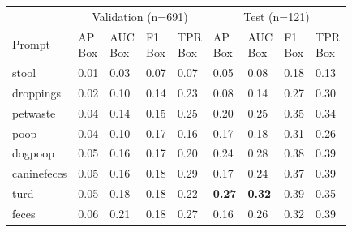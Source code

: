 \begin{table}[t]
\ifwacv \else \CaptionPrompt \fi
\centering
\begin{tabular}{lllllllll}
\toprule
\multicolumn{1}{l}{} & \multicolumn{4}{c}{Validation (n=691)} & \multicolumn{4}{c}{Test (n=121)} \\
 Prompt      & \makecell{AP\\Box}   & \makecell{AUC\\Box}   & \makecell{F1\\Box}   & \makecell{TPR\\Box}   & \makecell{AP\\Box}   & \makecell{AUC\\Box}   & \makecell{F1\\Box}   & \makecell{TPR\\Box}   \\
\midrule
 stool       & 0.01                 & 0.03                  & 0.07                 & 0.07                  & 0.05                 & 0.08                  & 0.18                 & 0.13                  \\
 droppings   & 0.02                 & 0.10                  & 0.14                 & 0.23                  & 0.08                 & 0.14                  & 0.27                 & 0.30                  \\
 petwaste    & 0.04                 & 0.14                  & 0.15                 & 0.25                  & 0.20                 & 0.25                  & 0.35                 & 0.34                  \\
 poop        & 0.04                 & 0.10                  & 0.17                 & 0.16                  & 0.17                 & 0.18                  & 0.31                 & 0.26                  \\
 dogpoop     & 0.05                 & 0.16                  & 0.17                 & 0.20                  & 0.24                 & 0.28                  & 0.38                 & 0.39                  \\
 caninefeces & 0.05                 & 0.16                  & 0.18                 & 0.29                  & 0.17                 & 0.24                  & 0.37                 & 0.39                  \\
 turd        & 0.05                 & 0.18                  & 0.18                 & 0.22                  & \textbf{0.27}        & \textbf{0.32}         & 0.39                 & 0.35                  \\
 feces       & 0.06                 & 0.21                  & 0.18                 & 0.27                  & 0.16                 & 0.26                  & 0.32                 & 0.39                  \\

\end{tabular}
\end{table}
